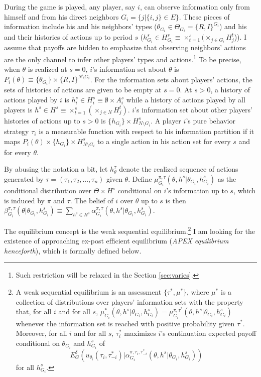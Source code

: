 \documentclass[12pt,letter]{article}
\theoremstyle{definition}
\theoremstyle{remark}
\theoremstyle{claim}
\begin{document}
During the game is played, any player, say $i$, can observe information only from himself and from his direct neighbors $G_i=\{j|\{i,j\}\in E\}$. These pieces of information include his and his neighbors' types ($\theta_{G_i}\in \Theta_{G_i}=\{R,I\}^{G_i}$) and his and their histories of actions up to period $s$ ($h^s_{G_i}\in H^s_{G_i}\equiv\times^s_{t=1}(\times_{j\in G_i}H^t_j$)). I assume that payoffs are hidden to emphasize that observing neighbors' actions are the only channel to infer other players' types and actions.\footnote{Such restriction will be relaxed in the Section \ref{sec:varies}.} 
To be precise, when $\theta$ is realized at $s=0$, $i$'s information set about $\theta$ is $P_{i}(\theta)\equiv\{\theta_{G_i}\}\times \{R,I\}^{N\setminus G_i}$. For the information sets about players' actions, the sets of histories of actions are given to be empty at $s=0$. At $s>0$, a history of actions played by $i$ is $h^s_i\in H^s_{i}\equiv\emptyset\times A^s_i$ while a history of actions played by all players is $h^s\in H^s\equiv\times^s_{t=1}(\times_{j\in N}H^t_j)$. $i$'s information set about other players' histories of actions up to $s>0$ is $\{h_{G_i}\}\times H^s_{N\setminus G_i}$. A player $i$'s pure behavior strategy $\tau_{i}$ is a measurable function with respect to his information partition if it maps $P_i(\theta)\times \{h_{G_i}\}\times H^s_{N\setminus G_i}$ to a single action in his action set for every $s$ and for every $\theta$. 

By abusing the notation a bit, let $h^{\tau}_\theta$ denote the realized sequence of actions generated by $\tau=(\tau_1,\tau_2,...,\tau_n)$ given $\theta$. Define $\mu^{\pi,\tau}_{G_i}(\theta, h^{s}|\theta_{G_i},h^{s}_{G_i})$ as the conditional distribution over $\Theta\times H^s$ conditional on $i$'s information up to $s$, which is induced by $\pi$ and $\tau$. The belief of $i$ over $\theta$ up to $s$ is then $\beta^{\pi,\tau}_{G_i}(\theta|\theta_{G_i},h^{s}_{G_i})\equiv \sum_{h^{s}\in H^s}\alpha^{\pi,\tau}_{G_i}(\theta, h^{s}|\theta_{G_i},h^{s}_{G_i})$.

The equilibrium concept is the weak sequential equilibrium.\footnote{A weak sequential equilibrium is an assessment $\{\tau^{*}, \mu^{*}\}$, where $\mu^{*}$ is a collection of distributions over players' information sets with the property that, for all $i$ and for all $s$, $\mu^{*}_{G_i}(\theta, h^{s}|\theta_{G_i},h^{s}_{G_i})=\mu^{\pi,\tau^{*}}_{G_i}(\theta, h^{s}|\theta_{G_i},h^{s}_{G_i})$ whenever the information set is reached with positive probability given $\tau^{*}$. Moreover, for all $i$ and for all $s$, $\tau^{*}_{i}$ maximizes $i$'s continuation expected payoff conditional on $\theta_{G_i}$ and $h^{s}_{G_i}$ of
\[E^{\delta}_G(u_{\theta_i}(\tau_{i},\tau^{*}_{-i})|\alpha^{\pi,\tau_{i},\tau^{*}_{-i}}_{G_i}(\theta, h^{s}|\theta_{G_i},h^{s}_{G_i}))\] for all $h^{s}_{G_i}$.} 
I am looking for the existence of approaching ex-post efficient equilibrium (\textit{APEX equilibrium henceforth}), which is formally defined below.
\end{document}
